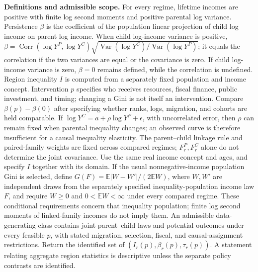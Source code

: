 \documentclass[11pt,a4paper]{article}
\newcommand{\E}{\mathbb E}
\newcommand{\Var}{\operatorname{Var}}
\begin{document}
\textbf{Definitions and admissible scope.} For every regime, lifetime incomes are positive with finite log second moments and positive parental log variance. Persistence \(\beta\) is the coefficient of the population linear projection of child log income on parent log income. When child log-income variance is positive, \(\beta=\operatorname{Corr}(\log Y^P,\log Y^C)\sqrt{\Var(\log Y^C)/\Var(\log Y^P)}\); it equals the correlation if the two variances are equal or the covariance is zero. If child log-income variance is zero, \(\beta=0\) remains defined, while the correlation is undefined. Region inequality \(I\) is computed from a separately fixed population and income concept. Intervention \(p\) specifies who receives resources, fiscal finance, public investment, and timing; changing a Gini is not itself an intervention. Compare \(\beta(p)-\beta(0)\) after specifying whether ranks, logs, migration, and cohorts are held comparable. If \(\log Y^C=a+\rho\log Y^P+\epsilon\), with uncorrelated error, then \(\rho\) can remain fixed when parental inequality changes; an observed curve is therefore insufficient for a causal inequality elasticity. The parent--child linkage rule and paired-family weights are fixed across compared regimes; \(F^P_r,F^C_r\) alone do not determine the joint covariance. Use the same real income concept and ages, and specify \(I\) together with its domain. If the usual nonnegative-income population Gini is selected, define \(G(F)=\E|W-W'|/(2\E W)\), where \(W,W'\) are independent draws from the separately specified inequality-population income law \(F\), and require \(W\geq0\) and \(0<\E W<\infty\) under every compared regime. These conditional requirements concern that inequality population; finite log second moments of linked-family incomes do not imply them. An admissible data-generating class contains joint parent--child laws and potential outcomes under every feasible \(p\), with stated migration, selection, fiscal, and causal-assignment restrictions. Return the identified set of \((I_r(p),\beta_r(p),\tau_r(p))\). A statement relating aggregate region statistics is descriptive unless the separate policy contrasts are identified.
\end{document}
